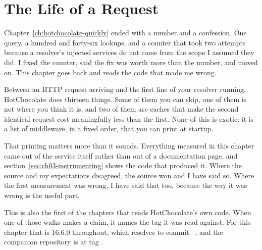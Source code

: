 \chapter{The Life of a Request}
\label{ch:the-life-of-a-request}

Chapter~\ref{ch:hotchocolate-quickly} ended with a number and a confession. One
query, a hundred and forty-six lookups, and a counter that took two attempts
because a resolver's injected services do not come from the scope I assumed they
did. I fixed the counter, said the fix was worth more than the number, and moved
on. This chapter goes back and reads the code that made me wrong.

Between an HTTP request arriving and the first line of your resolver running,
HotChocolate does thirteen things. Some of them you can skip, one of them is not
where you think it is, and two of them are caches that make the second identical
request cost meaningfully less than the first. None of this is exotic: it is a
list of middleware, in a fixed order, that you can print at startup.

That printing matters more than it sounds. Everything measured in this chapter
came out of the service itself rather than out of a documentation page, and
section~\ref{sec:ch03-instrumenting} shows the code that produced it.
Where the source and my expectations disagreed, the source won and I have said
so. Where the first measurement was wrong, I have said that too, because the way
it was wrong is the useful part.

This is also the first of the chapters that reads HotChocolate's own code. When
one of those walks makes a claim, it names the tag it was read against. For this
chapter that is 16.6.0 throughout, which resolves to commit
~\autocite{chillicream2026source}, and the companion repository is
at tag .








